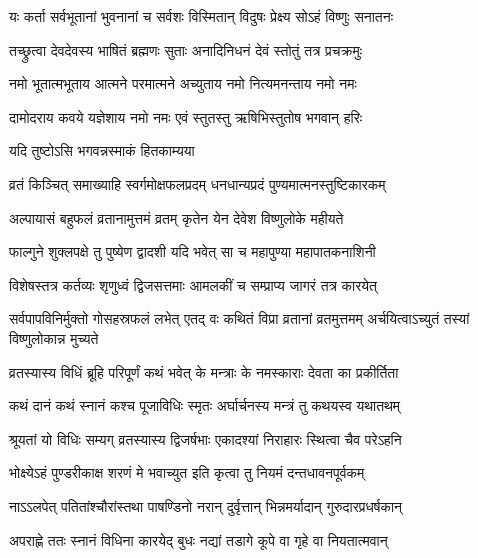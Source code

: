 \twolineshloka
{यः कर्ता सर्वभूतानां भुवनानां च सर्वशः}
{विस्मितान् विदुषः प्रेक्ष्य सोऽहं विष्णुः सनातनः}%

\twolineshloka
{तच्छ्रुत्वा देवदेवस्य भाषितं ब्रह्मणः सुताः}
{अनादिनिधनं देवं स्तोतुं तत्र प्रचक्रमुः}%

\twolineshloka
{नमो भूतात्मभूताय आत्मने परमात्मने}
{अच्युताय नमो नित्यमनन्ताय नमो नमः}%

\twolineshloka
{दामोदराय कवये यज्ञेशाय नमो नमः}
{एवं स्तुतस्तु ऋषिभिस्तुतोष भगवान् हरिः}%



\onelineshloka
{यदि तुष्टोऽसि भगवन्नस्माकं हितकाम्यया}%

\twolineshloka
{व्रतं किञ्चित् समाख्याहि स्वर्गमोक्षफलप्रदम्}
{धनधान्यप्रदं पुण्यमात्मनस्तुष्टिकारकम्}%

\twolineshloka
{अल्पायासं बहुफलं व्रतानामुत्तमं व्रतम्}
{कृतेन येन देवेश विष्णुलोके महीयते}%


\twolineshloka
{फाल्गुने शुक्लपक्षे तु पुष्येण द्वादशी यदि}
{भवेत् सा च महापुण्या महापातकनाशिनी}%

\twolineshloka
{विशेषस्तत्र कर्तव्यः शृणुध्वं द्विजसत्तमाः}
{आमलकीं च सम्प्राप्य जागरं तत्र कारयेत्}%

\threelineshloka
{सर्वपापविनिर्मुक्तो गोसहस्रफलं लभेत्}
{एतद् वः कथितं विप्रा व्रतानां व्रतमुत्तमम्}
{अर्चयित्वाऽच्युतं तस्यां विष्णुलोकान्न मुच्यते}%


\twolineshloka
{व्रतस्यास्य विधिं ब्रूहि परिपूर्णं कथं भवेत्}
{के मन्त्राः के नमस्काराः देवता का प्रकीर्तिता}%

\twolineshloka
{कथं दानं कथं स्नानं कश्च पूजाविधिः स्मृतः}
{अर्घार्चनस्य मन्त्रं तु कथयस्व यथातथम्}%


\twolineshloka
{श्रूयतां यो विधिः सम्यग् व्रतस्यास्य द्विजर्षभाः}
{एकादश्यां निराहारः स्थित्वा चैव परेऽहनि}%

\twolineshloka
{भोक्ष्येऽहं पुण्डरीकाक्ष शरणं मे भवाच्युत}
{इति कृत्वा तु नियमं दन्तधावनपूर्वकम्}%

\twolineshloka
{नाऽऽलपेत् पतितांश्चौरांस्तथा पाषण्डिनो नरान्}
{दुर्वृत्तान् भिन्नमर्यादान् गुरुदारप्रधर्षकान्}%

\twolineshloka
{अपराह्णे ततः स्नानं विधिना कारयेद् बुधः}
{नद्यां तडागे कूपे वा गृहे वा नियतात्मवान्}%

